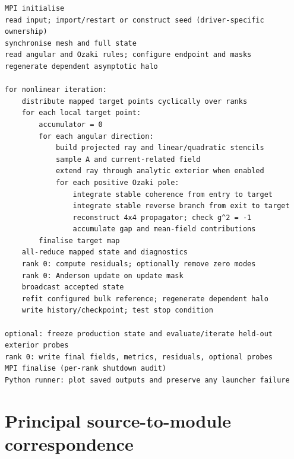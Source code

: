 \documentclass[11pt,a4paper]{article}
\begin{document}
\begin{verbatim}
MPI initialise
read input; import/restart or construct seed (driver-specific ownership)
synchronise mesh and full state
read angular and Ozaki rules; configure endpoint and masks
regenerate dependent asymptotic halo

for nonlinear iteration:
    distribute mapped target points cyclically over ranks
    for each local target point:
        accumulator = 0
        for each angular direction:
            build projected ray and linear/quadratic stencils
            sample A and current-related field
            extend ray through analytic exterior when enabled
            for each positive Ozaki pole:
                integrate stable coherence from entry to target
                integrate stable reverse branch from exit to target
                reconstruct 4x4 propagator; check g^2 = -1
                accumulate gap and mean-field contributions
        finalise target map
    all-reduce mapped state and diagnostics
    rank 0: compute residuals; optionally remove zero modes
    rank 0: Anderson update on update mask
    broadcast accepted state
    refit configured bulk reference; regenerate dependent halo
    write history/checkpoint; test stop condition

optional: freeze production state and evaluate/iterate held-out exterior probes
rank 0: write final fields, metrics, residuals, optional probes
MPI finalise (per-rank shutdown audit)
Python runner: plot saved outputs and preserve any launcher failure
\end{verbatim}

\section{Principal source-to-module correspondence}
\end{document}
